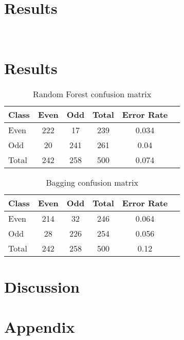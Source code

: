\documentclass[a4paper,10pt]{article}
\begin{document}
\section{Results}
\begin{figure}[H]
  \hfill
   \\
  \hfill
\end{figure}

\section{Results}
\begin{figure}[H]
  \hfill
  \hfill
\end{figure}

\begin{table}[h]
\centering
\begin{tabular}{l*{4}{c}r}
  Class & Even & Odd & Total & Error Rate\\
  \hline
  Even & 222 & 17 & 239 & 0.034 \\
  Odd & 20 & 241 & 261 & 0.04\\
  Total & 242 & 258 & 500 & 0.074\\
\end{tabular}
\caption{Random Forest confusion matrix}
\label{table:rf_conf}
\end{table}

\begin{table}[h]
\centering
\begin{tabular}{l*{4}{c}r}
  Class              & Even & Odd & Total & Error Rate\\
  \hline
  Even & 214 & 32 & 246 & 0.064 \\
  Odd & 28 & 226 & 254 & 0.056\\
  Total & 242 & 258 & 500 & 0.12\\
\end{tabular}
\caption{Bagging confusion matrix}
\label{table:bag_conf}
\end{table}



\section{Discussion}


\section{Appendix}
\begin{verbatim}


\end{verbatim}
\end{document}
